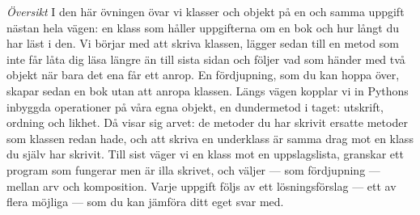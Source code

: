 \emph{Översikt}
I den här övningen övar vi klasser och objekt på en och samma uppgift
nästan hela vägen: en klass som håller uppgifterna om en bok och hur
långt du har läst i den.  Vi börjar med att skriva klassen, lägger sedan
till en metod som inte får låta dig läsa längre än till sista sidan och
följer vad som händer med två objekt när bara det ena får ett anrop.
En fördjupning, som du kan hoppa över, skapar sedan en bok utan att
anropa klassen.  Längs vägen kopplar vi in Pythons inbyggda operationer
på våra egna objekt, en dundermetod i taget: utskrift, ordning och
likhet.  Då visar sig arvet: de metoder du har skrivit ersatte metoder
som klassen redan hade, och att skriva en underklass är samma drag mot
en klass du själv har skrivit.
Till sist väger vi en klass mot en uppslagslista, granskar ett program
som fungerar men är illa skrivet, och väljer --- som fördjupning ---
mellan arv och komposition.  Varje uppgift följs av ett
lösningsförslag --- ett av flera möjliga --- som du kan jämföra ditt
eget svar med.

